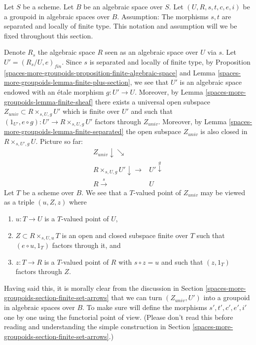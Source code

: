 \medskip\noindent
Let $S$ be a scheme.
Let $B$ be an algebraic space over $S$.
Let $(U, R, s, t, c, e, i)$ be a groupoid in algebraic spaces over $B$.
Assumption: The morphisms $s, t$ are separated and locally of finite type.
This notation and assumption will we be fixed throughout this section.

\medskip\noindent
Denote $R_s$ the algebraic space $R$ seen as an
algebraic space over $U$ via $s$. Let
$U' = (R_s/U, e)_{fin}$. Since $s$ is separated and locally of
finite type, by
Proposition \ref{spaces-more-groupoids-proposition-finite-algebraic-space} and
Lemma \ref{spaces-more-groupoids-lemma-finite-plus-section},
we see that $U'$ is an algebraic space endowed with an \'etale morphism
$g : U' \to U$. Moreover, by
Lemma \ref{spaces-more-groupoids-lemma-finite-sheaf}
there exists a universal open subspace
$Z_{univ} \subset R \times_{s, U, g} U'$ which is finite over $U'$
and such that $(1_{U'}, e \circ g) : U' \to R \times_{s, U, g} U'$
factors through $Z_{univ}$. Moreover, by
Lemma \ref{spaces-more-groupoids-lemma-finite-separated}
the open subspace $Z_{univ}$ is also closed in $R \times_{s, U', g} U$.
Picture so far:
$$
\begin{array}{cc}Z_{univ} \downarrow\searrow &  \\ R \times_{s, U, g} U' \downarrow\longrightarrow & U' \overset{g}{\downarrow} \\ R \overset{s}{\longrightarrow} & U\end{array}
$$
Let $T$ be a scheme over $B$. We see that a $T$-valued point of
$Z_{univ}$ may be viewed as a triple $(u, Z, z)$ where
\begin{enumerate}
\item $u : T \to U$ is a $T$-valued point of $U$,
\item $Z \subset R \times_{s, U, u} T$ is an open and closed subspace
finite over $T$ such that $(e \circ u, 1_T)$ factors through it, and
\item $z : T \to R$ is a $T$-valued point of $R$ with $s \circ z = u$
and such that $(z, 1_T)$ factors through $Z$.
\end{enumerate}
Having said this, it is morally clear from the discussion in
Section \ref{spaces-more-groupoids-section-finite-set-arrows}
that we can turn $(Z_{univ}, U')$ into a groupoid in algebraic spaces
over $B$. To make sure will define the morphisms $s', t', c', e', i'$
one by one using the functorial point of view. (Please don't read this
before reading and understanding the simple construction in
Section \ref{spaces-more-groupoids-section-finite-set-arrows}.)

